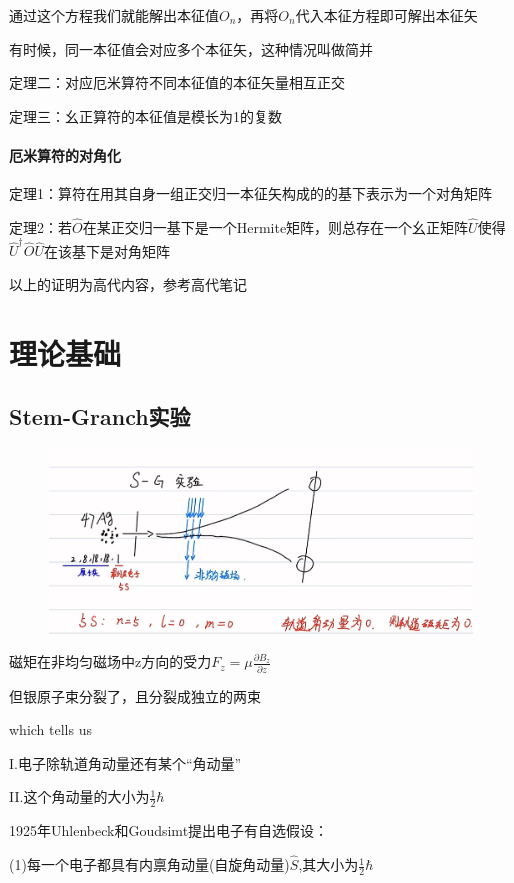 \documentclass[lang=cn,15pt]{elegantbook}
\begin{document}
通过这个方程我们就能解出本征值$O_n$，再将$O_n$代入本征方程即可解出本征矢

有时候，同一本征值会对应多个本征矢，这种情况叫做简并

定理二：对应厄米算符不同本征值的本征矢量相互正交

定理三：幺正算符的本征值是模长为1的复数

\subsubsection{厄米算符的对角化}
定理1：算符在用其自身一组正交归一本征矢构成的的基下表示为一个对角矩阵

定理2：若$\hat{O}$在某正交归一基下是一个Hermite矩阵，则总存在一个幺正矩阵$\hat{U}
$使得$\hat{U}^{\dagger}\hat{O}\hat{U}$在该基下是对角矩阵

以上的证明为高代内容，参考高代笔记

\chapter{理论基础}
\section{Stem-Granch实验}
\begin{figure}[H]
	\centering
	\includegraphics[width=0.9\linewidth]{figure/screenshot0015}
\end{figure}
磁矩在非均匀磁场中z方向的受力$F_z=\mu\frac{\partial B_z}{\partial z}$

但银原子束分裂了，且分裂成独立的两束

which tells us

I.电子除轨道角动量还有某个“角动量”

II.这个角动量的大小为$\frac{1}{2}\hbar$

1925年Uhlenbeck和Goudsimt提出电子有自选假设：

(1)每一个电子都具有内禀角动量(自旋角动量)$\hat{S}$,其大小为$\frac{1}{2}\hbar$
\end{document}
